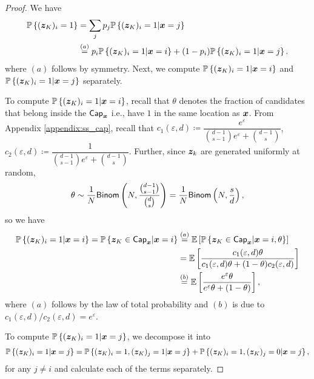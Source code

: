 \begin{proof}
We have
\begin{align}
    \mathbb{P}\left\{ ({\boldsymbol{z}}_K)_i  = 1 \right\} 
    & = \sum_j p_j \mathbb{P}\left\{ ({\boldsymbol{z}}_K)_i = 1 \middle\vert {\boldsymbol{x}} = j\right\}  \\
    & \stackrel{(a)}{=} p_i\mathbb{P}\left\{ ({\boldsymbol{z}}_K)_i = 1 \middle\vert {\boldsymbol{x}} = i\right\} + (1-p_i) \mathbb{P}\left\{ ({\boldsymbol{z}}_K)_i = 1 \middle\vert {\boldsymbol{x}} = j\right\}. \label{eq:ss_step_1}
\end{align}
where $(a)$ follows by symmetry. Next, we compute $\mathbb{P}\left\{ ({\boldsymbol{z}}_K)_i = 1 \middle\vert {\boldsymbol{x}} = i\right\}$ and $\mathbb{P}\left\{ ({\boldsymbol{z}}_K)_i = 1 \middle\vert {\boldsymbol{x}} = j \right\}$ separately.

To compute $\mathbb{P}\left\{ ({\boldsymbol{z}}_K)_i = 1 \middle\vert {\boldsymbol{x}} = i\right\}$, recall that $\theta$ denotes the fraction of candidates that belong inside the $\mathsf{Cap}_{{\boldsymbol{x}}}$ i.e., have $1$ in the same location as ${\boldsymbol{x}}$. From Appendix \ref{appendix:ss_cap}, recall that $c_1(\varepsilon,d) \coloneqq \dfrac{e^\varepsilon}{\binom{d-1}{s-1}e^\varepsilon + \binom{d-1}{s}}$, $c_2(\varepsilon,d) \coloneqq \dfrac{1}{\binom{d-1}{s-1}e^\varepsilon + \binom{d-1}{s}}$. Further, since ${\boldsymbol{z}}_k$ are generated uniformly at random,
$$ \theta \sim \frac{1}{N} \mathsf{Binom}\left( N, \frac{\binom{d-1}{s-1}}{\binom{d}{s}} \right) = \frac{1}{N} \mathsf{Binom}\left( N, \frac{s}{d} \right),$$ so we have
\begin{align}
    \mathbb{P}\left\{ ({\boldsymbol{z}}_K)_i = 1 | {\boldsymbol{x}} = i \right\} = \mathbb{P}\left\{ {\boldsymbol{z}}_K \in \mathsf{Cap}_{{\boldsymbol{x}}} | {\boldsymbol{x}} = i \right\}  & \stackrel{(a)}{=} \mathbb{E}\left[ \mathbb{P}\left\{ {\boldsymbol{z}}_K  \in \mathsf{Cap}_{{\boldsymbol{x}}} |{\boldsymbol{x}}=i, \theta \right\}\right]\\
    & = \mathbb{E}\left[ \frac{c_1(\varepsilon,d) \theta}{c_1(\varepsilon,d) \theta + (1-\theta)c_2(\varepsilon,d)} \right] \\
    & \stackrel{(b)}{=} \mathbb{E}\left[ \frac{e^\varepsilon \theta}{e^\varepsilon \theta + (1-\theta)} \right], \label{eq:ss_step_2}
\end{align}
where $(a)$ follows by the law of total probability and $(b)$ is due to $c_1(\varepsilon,d)/c_2(\varepsilon,d) = e^\varepsilon$.

To compute $\mathbb{P}\left\{ ({\boldsymbol{z}}_K)_i = 1 \middle\vert {\boldsymbol{x}} = j \right\}$, we decompose it into
\begin{align}
    \mathbb{P}\left\{ ({\boldsymbol{z}}_K)_i = 1 \middle\vert {\boldsymbol{x}} = j \right\} = \mathbb{P}\left\{ ({\boldsymbol{z}}_K)_i = 1, ({\boldsymbol{z}}_K)_j = 1 \middle\vert {\boldsymbol{x}} = j\right\} + \mathbb{P}\left\{ ({\boldsymbol{z}}_K)_i = 1, ({\boldsymbol{z}}_K)_j = 0 \middle\vert {\boldsymbol{x}} = j\right\}, \label{eq:Step0}
\end{align}
for any $j \neq i$ and calculate each of the terms separately.


\end{proof}
